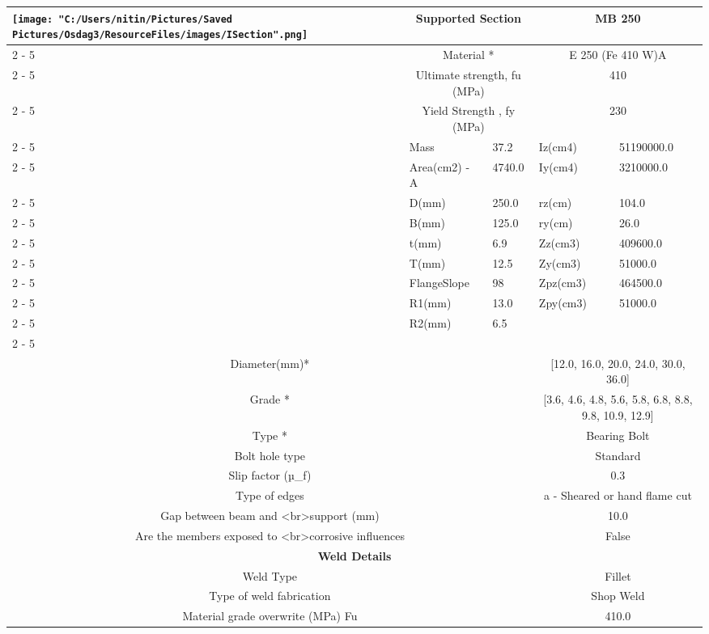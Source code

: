 \documentclass{article}%
\begin{document}
\begin{longtable}{|p{5cm}|p{2cm}|p{2cm}|p{2cm}|p{5cm}|}
\multirow{13}{*}{\texttt{[image: "C:/Users/nitin/Pictures/Saved Pictures/Osdag3/ResourceFiles/images/ISection".png]}}&\multicolumn{2}{|c|}{Supported Section}&\multicolumn{2}{|c|}{MB 250}\\%
\cline{2%
-%
5}%
&\multicolumn{2}{|c|}{Material *}&\multicolumn{2}{|c|}{E 250 (Fe 410 W)A}\\%
\cline{2%
-%
5}%
&\multicolumn{2}{|c|}{Ultimate strength, fu (MPa)}&\multicolumn{2}{|c|}{410}\\%
\cline{2%
-%
5}%
&\multicolumn{2}{|c|}{Yield Strength , fy (MPa)}&\multicolumn{2}{|c|}{230}\\%
\cline{2%
-%
5}%
&Mass&37.2&Iz(cm4)&51190000.0\\%
\cline{2%
-%
5}%
&Area(cm2) {-} A&4740.0&Iy(cm4)&3210000.0\\%
\cline{2%
-%
5}%
&D(mm)&250.0&rz(cm)&104.0\\%
\cline{2%
-%
5}%
&B(mm)&125.0&ry(cm)&26.0\\%
\cline{2%
-%
5}%
&t(mm)&6.9&Zz(cm3)&409600.0\\%
\cline{2%
-%
5}%
&T(mm)&12.5&Zy(cm3)&51000.0\\%
\cline{2%
-%
5}%
&FlangeSlope&98&Zpz(cm3)&464500.0\\%
\cline{2%
-%
5}%
&R1(mm)&13.0&Zpy(cm3)&51000.0\\%
\cline{2%
-%
5}%
&R2(mm)&6.5&&\\%
\cline{2%
-%
5}%
\hline%
\multicolumn{5}{|c|}{\textbf{Bolt Details}}\\%
\hline%
\hline%
\multicolumn{3}{|c|}{Diameter(mm)*}&\multicolumn{2}{|c|}{{[}12.0, 16.0, 20.0, 24.0, 30.0, 36.0{]}}\\%
\hline%
\hline%
\multicolumn{3}{|c|}{Grade *}&\multicolumn{2}{|c|}{{[}3.6, 4.6, 4.8, 5.6, 5.8, 6.8, 8.8, 9.8, 10.9, 12.9{]}}\\%
\hline%
\hline%
\multicolumn{3}{|c|}{Type *}&\multicolumn{2}{|c|}{Bearing Bolt}\\%
\hline%
\hline%
\multicolumn{3}{|c|}{Bolt hole type}&\multicolumn{2}{|c|}{Standard}\\%
\hline%
\hline%
\multicolumn{3}{|c|}{Slip factor (µ\_f)}&\multicolumn{2}{|c|}{0.3}\\%
\hline%
\hline%
\multicolumn{3}{|c|}{Type of edges}&\multicolumn{2}{|c|}{a {-} Sheared or hand flame cut}\\%
\hline%
\hline%
\multicolumn{3}{|c|}{Gap between beam and <br>support (mm)}&\multicolumn{2}{|c|}{10.0}\\%
\hline%
\hline%
\multicolumn{3}{|c|}{Are the members exposed to <br>corrosive influences}&\multicolumn{2}{|c|}{False}\\%
\hline%
\hline%
\multicolumn{5}{|c|}{\textbf{Weld Details}}\\%
\hline%
\hline%
\multicolumn{3}{|c|}{Weld Type}&\multicolumn{2}{|c|}{Fillet}\\%
\hline%
\hline%
\multicolumn{3}{|c|}{Type of weld fabrication}&\multicolumn{2}{|c|}{Shop Weld}\\%
\hline%
\hline%
\multicolumn{3}{|c|}{Material grade overwrite (MPa) Fu}&\multicolumn{2}{|c|}{410.0}\\%
\hline%
\end{longtable}
\end{document}
